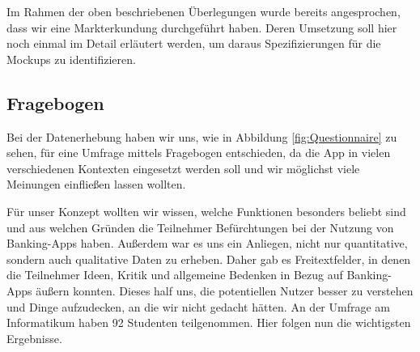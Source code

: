 Im Rahmen der oben beschriebenen Überlegungen wurde bereits angesprochen, dass wir eine Markterkundung durchgeführt haben. Deren Umsetzung soll hier noch einmal im Detail erläutert werden, um daraus Spezifizierungen für die Mockups zu identifizieren.

\subsection{Fragebogen}
	Bei der Datenerhebung haben wir uns, wie in Abbildung \ref{fig:Questionnaire} zu sehen, für eine Umfrage mittels Fragebogen entschieden, da die App in vielen verschiedenen Kontexten eingesetzt werden soll und wir möglichst viele Meinungen einfließen lassen wollten. 
	
	Für unser Konzept wollten wir wissen, welche Funktionen besonders beliebt sind und aus welchen Gründen die Teilnehmer Befürchtungen bei der Nutzung von Banking-Apps haben. Außerdem war es uns ein Anliegen, nicht nur quantitative, sondern auch qualitative Daten zu erheben. Daher gab es Freitextfelder, in denen die Teilnehmer Ideen, Kritik und allgemeine Bedenken in Bezug auf Banking-Apps äußern konnten. Dieses half uns, die potentiellen Nutzer besser zu verstehen und Dinge aufzudecken, an die wir nicht gedacht hätten. An der Umfrage am Informatikum haben 92 Studenten teilgenommen. Hier folgen nun die wichtigsten Ergebnisse. 
	
